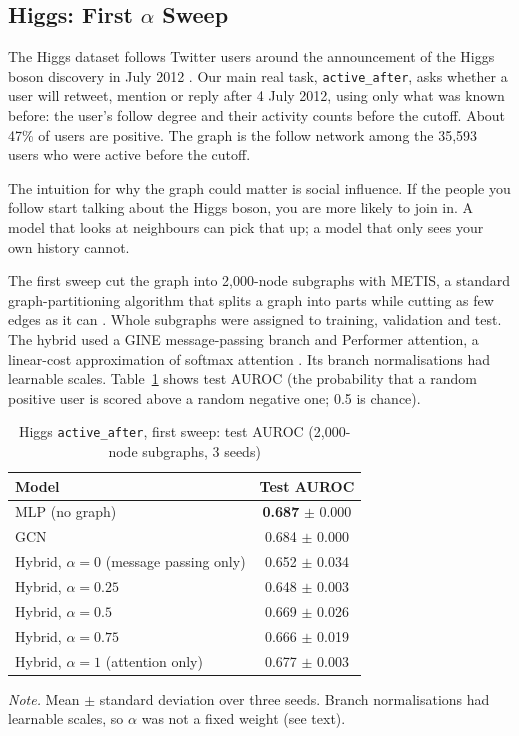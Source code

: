 \subsection{Higgs: First $\alpha$ Sweep}
The Higgs dataset follows Twitter users around the announcement of the Higgs boson discovery in July 2012 \citep{f_dedomenico2013}. Our main real task, \texttt{active\_\allowbreak after}, asks whether a user will retweet, mention or reply after 4 July 2012, using only what was known before: the user's follow degree and their activity counts before the cutoff. About 47\% of users are positive. The graph is the follow network among the 35,593 users who were active before the cutoff.

The intuition for why the graph could matter is social influence. If the people you follow start talking about the Higgs boson, you are more likely to join in. A model that looks at neighbours can pick that up; a model that only sees your own history cannot.

The first sweep cut the graph into 2,000-node subgraphs with METIS, a standard graph-partitioning algorithm that splits a graph into parts while cutting as few edges as it can \citep{f_karypis1998}. Whole subgraphs were assigned to training, validation and test. The hybrid used a GINE message-passing branch and Performer attention, a linear-cost approximation of softmax attention \citep{f_choromanski2021}. Its branch normalisations had learnable scales. Table~\ref{tab:higgsA} shows test AUROC (the probability that a random positive user is scored above a random negative one; 0.5 is chance).

\begin{table}[htbp]
\caption{Higgs \texttt{active\_\allowbreak after}, first sweep: test AUROC (2,000-node subgraphs, 3 seeds)}
\label{tab:higgsA}
\centering\small
\begin{tabular}{@{}lc@{}}
\toprule
Model & Test AUROC \\
\midrule
MLP (no graph) & \textbf{0.687} $\pm$ 0.000 \\
GCN & 0.684 $\pm$ 0.000 \\
Hybrid, $\alpha=0$ (message passing only) & 0.652 $\pm$ 0.034 \\
Hybrid, $\alpha=0.25$ & 0.648 $\pm$ 0.003 \\
Hybrid, $\alpha=0.5$ & 0.669 $\pm$ 0.026 \\
Hybrid, $\alpha=0.75$ & 0.666 $\pm$ 0.019 \\
Hybrid, $\alpha=1$ (attention only) & 0.677 $\pm$ 0.003 \\
\bottomrule
\end{tabular}

\vspace{4pt}
\parbox{0.8\textwidth}{\footnotesize\textit{Note.} Mean $\pm$ standard deviation over three seeds. Branch normalisations had learnable scales, so $\alpha$ was not a fixed weight (see text).}
\end{table}


